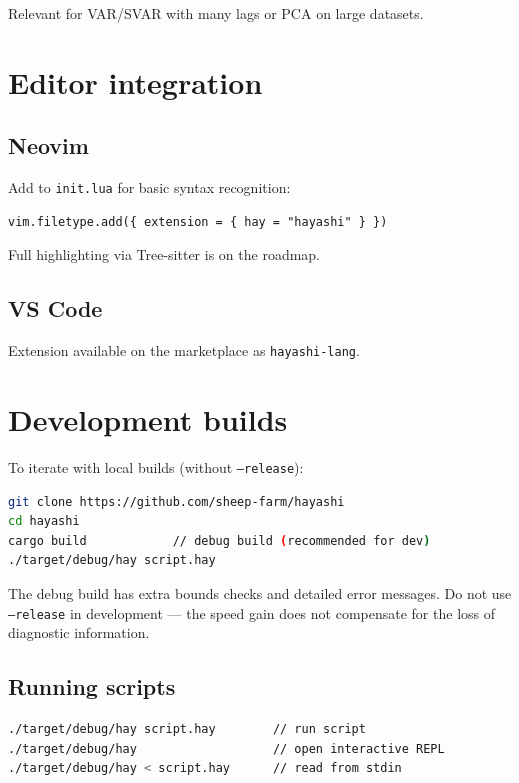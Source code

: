 Relevant for VAR/SVAR with many lags or PCA on large datasets.

\section{Editor integration}

\subsection*{Neovim}

Add to \texttt{init.lua} for basic syntax recognition:

\begin{lstlisting}[style=inline, language=Hayashi]
vim.filetype.add({ extension = { hay = "hayashi" } })
\end{lstlisting}

Full highlighting via Tree-sitter is on the roadmap.

\subsection*{VS Code}

Extension available on the marketplace as \texttt{hayashi-lang}.

\section{Development builds}

To iterate with local builds (without \texttt{--release}):

\begin{lstlisting}[style=inline, language=sh]
git clone https://github.com/sheep-farm/hayashi
cd hayashi
cargo build            // debug build (recommended for dev)
./target/debug/hay script.hay
\end{lstlisting}

The debug build has extra bounds checks and detailed error messages.
Do not use \texttt{--release} in development — the speed gain does not
compensate for the loss of diagnostic information.

\subsection*{Running scripts}

\begin{lstlisting}[style=inline, language=sh]
./target/debug/hay script.hay        // run script
./target/debug/hay                   // open interactive REPL
./target/debug/hay < script.hay      // read from stdin
\end{lstlisting}
